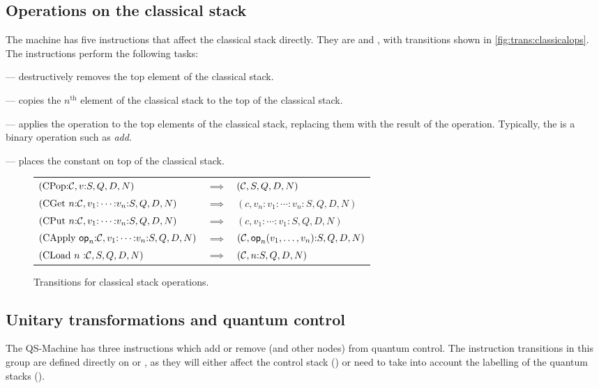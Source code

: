 \subsection{Operations on the classical stack}\label{subsec:operationsonclassicalstack}
The machine has five instructions that affect the classical stack directly.
They are  and , with 
transitions shown in \vref{fig:trans:classicalops}. The instructions perform
the following tasks:
\begin{description}
\item{} --- destructively removes the top element of the
classical stack.
\item{} --- copies the $n^{\text{th}}$ element of the 
classical stack to the top of the classical stack.
\item{} --- applies the operation  to 
the top elements of the classical stack, replacing them with the result of 
the operation. Typically, the 
 is  a binary operation such as 
\emph{add}.
\item{} --- places the constant   on
 top  of the classical stack.
\end{description}

\begin{figure}[htbp]
\begin{tabular}{lll}
$(\mathrm{CPop} {:}\mathcal{C},v{:}S,Q,D,N) $ &$\implies  $ &$(\mathcal{C},S,Q,D,N)$ \\[12pt]
$(\mathrm{CGet}\ n {:}\cd,v_1{:}\cdots{:}v_n{:}S,Q,D,N)  $ &$\implies $ &$ (c,v_n{:}v_1{:}\cdots{:}v_n{:}S,Q,D,N)$ \\[12pt]
$(\mathrm{CPut}\ n {:}\cd,v_1{:}\cdots{:}v_n{:}S,Q,D,N)  $ &$\implies  $ &$(c,v_1{:}\cdots{:}v_1{:}S,Q,D,N)$ \\[12pt]
$(\mathrm{CApply}\ \mathrm{\textsf{op}}_n{:}\cd,v_1{:}\cdots{:}v_n{:}S,Q,D,N)  $ &$\implies  $ &$(\mathcal{C},\mathrm{\textsf{op}}_n(v_1,\ldots,v_n){:}S,Q,D,N)$ \\[12pt]
$(\mathrm{CLoad}\ n\ {:}\mathcal{C},S,Q,D,N) $ &$ \implies $ &$ (\mathcal{C},n{:}S,Q,D,N)$
\end{tabular}
\caption{Transitions for classical stack operations.}\label{fig:trans:classicalops}
\end{figure}

\subsection{Unitary transformations and quantum control}\label{subsec:trans:unitarytransformations}
The QS-Machine has three instructions which add or remove \qbits{} (and other nodes)
from quantum control. The instruction transitions in this group
are defined directly on \cms{} or \lbms,  
as they will either affect the control
stack () or need to take into account
 the labelling of the quantum stacks (). 

